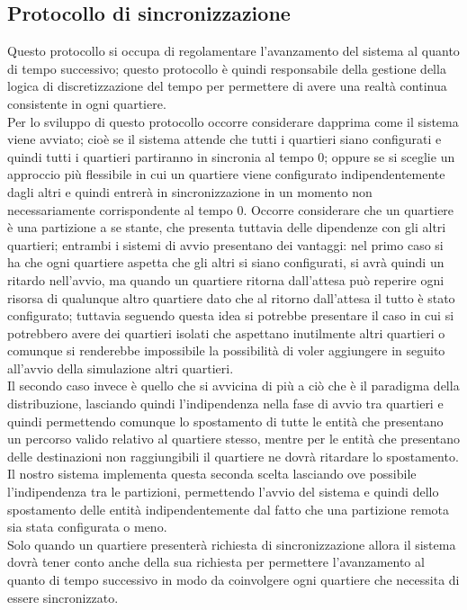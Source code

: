 \subsection{Protocollo di sincronizzazione}
Questo protocollo si occupa di regolamentare l'avanzamento del sistema al quanto di tempo successivo; questo protocollo è quindi responsabile della gestione della logica di discretizzazione del tempo per permettere di avere una realtà continua consistente in ogni quartiere.\\
Per lo sviluppo di questo protocollo occorre considerare dapprima come il sistema viene avviato; cioè se il sistema attende che tutti i quartieri siano configurati e quindi tutti i quartieri partiranno in sincronia al tempo 0; oppure se si sceglie un approccio più flessibile in cui un quartiere viene configurato indipendentemente dagli altri e quindi entrerà in sincronizzazione in un momento non necessariamente corrispondente al tempo 0. Occorre considerare che un quartiere è una partizione a se stante, che presenta tuttavia delle dipendenze con gli altri quartieri; entrambi i sistemi di avvio presentano dei vantaggi: nel primo caso si ha che ogni quartiere aspetta che gli altri si siano configurati, si avrà quindi un ritardo nell'avvio, ma quando un quartiere ritorna dall'attesa può reperire ogni risorsa di qualunque altro quartiere dato che al ritorno dall'attesa il tutto è stato configurato; tuttavia seguendo questa idea si potrebbe presentare il caso in cui si potrebbero avere dei quartieri isolati che aspettano inutilmente altri quartieri o comunque si renderebbe impossibile la possibilità di voler aggiungere in seguito all'avvio della simulazione altri quartieri.\\
Il secondo caso invece è quello che si avvicina di più a ciò che è il paradigma della distribuzione, lasciando quindi l'indipendenza nella fase di avvio tra quartieri e quindi permettendo comunque lo spostamento di tutte le entità che presentano un percorso valido relativo al quartiere stesso, mentre per le entità che presentano delle destinazioni non raggiungibili il quartiere ne dovrà ritardare lo spostamento. Il nostro sistema implementa questa seconda scelta lasciando ove possibile l'indipendenza tra le partizioni, permettendo l'avvio del sistema e quindi dello spostamento delle entità indipendentemente dal fatto che una partizione remota sia stata configurata o meno.\\
Solo quando un quartiere presenterà richiesta di sincronizzazione allora il sistema dovrà tener conto anche della sua richiesta per permettere l'avanzamento al quanto di tempo successivo in modo da coinvolgere ogni quartiere che necessita di essere sincronizzato.\\
